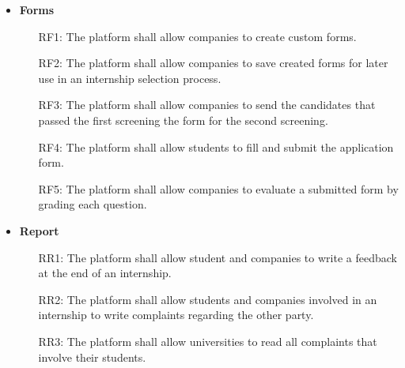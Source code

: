\documentclass[11pt,twoside]{article}
\begin{document}
\begin{itemize}
\begin{itemize}
\end{itemize}
\item \textbf{Forms}
\begin{itemize}
\item[RF1:] The platform shall allow companies to create custom forms.
\item[RF2:] The platform shall allow companies to save created forms for later use in an internship selection process.
\item[RF3:] The platform shall allow companies to send the candidates that passed the first screening the form for the second screening.
\item[RF4:] The platform shall allow students to fill and submit the application form.
\item[RF5:] The platform shall allow companies to evaluate a submitted form by grading each question.
\end{itemize}
\item \textbf{Report}
\begin{itemize}
\item[RR1:] The platform shall allow student and companies to write a feedback at the end of an internship.
\item[RR2:] The platform shall allow students and companies involved in an internship to write complaints regarding the other party.
\item[RR3:] The platform shall allow universities to read all complaints that involve their students.
\end{itemize}
\end{itemize}
\end{document}
